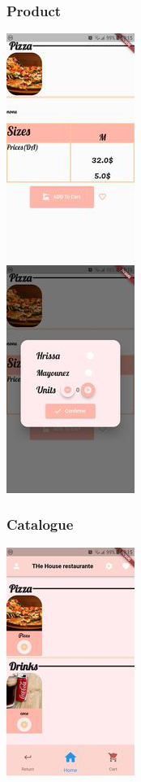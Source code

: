 \documentclass{article}
\begin{document}
\subsubsection{Product}
\includegraphics[scale=1]{./out/MobileApp/Ui/1.png}\\
\includegraphics[scale=1]{./out/MobileApp/Ui/3.png}

\subsubsection{Catalogue}
\includegraphics[scale=1]{./out/MobileApp/Ui/2.png}
\end{document}
